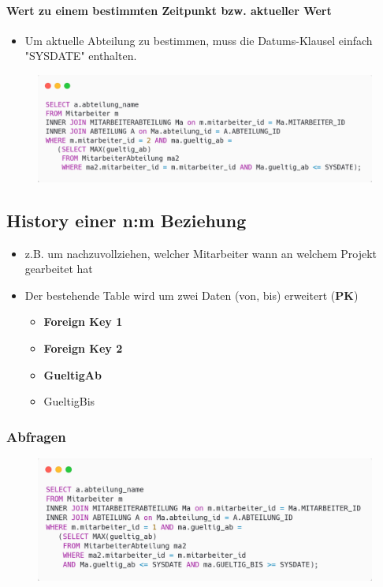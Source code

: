 \paragraph{Wert zu einem bestimmten Zeitpunkt bzw. aktueller Wert}
\begin{itemize}
    \item Um aktuelle Abteilung zu bestimmen, muss die Datums-Klausel einfach "SYSDATE" enthalten.
\end{itemize}
\begin{figure}[H]
    \centering
    \includegraphics[width=\textwidth]{res/themenkorb_4/history_1_n.png}
\end{figure}

\subsection{History einer n:m Beziehung}
\begin{itemize}
    \item z.B. um nachzuvollziehen, welcher Mitarbeiter wann an welchem Projekt gearbeitet hat
    \item Der bestehende Table wird um zwei Daten (von, bis) erweitert (\textbf{PK})
    \begin{itemize}
        \item \textbf{Foreign Key 1}
        \item \textbf{Foreign Key 2}
        \item \textbf{GueltigAb}
        \item GueltigBis
    \end{itemize}
\end{itemize}
\subsubsection{Abfragen}
\begin{figure}[H]
    \centering
    \includegraphics[width=\textwidth]{res/themenkorb_4/history_n_m.png}
\end{figure}

